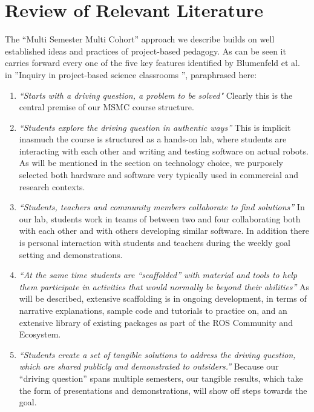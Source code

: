 \section{Review of Relevant Literature}

The ``Multi Semester Multi Cohort'' approach we describe builds on well established ideas and practices of project-based pedagogy\cite{projects}. As can be seen it carries forward every one of the five key features identified by Blumenfeld et al. in ''Inquiry in project-based science classrooms \cite{blumenfeld}'', paraphrased here:
\begin{enumerate}
    \item \textit{``Starts with a driving question, a problem to be solved"} Clearly this is the central premise of our MSMC course structure.
    \item \textit{``Students explore the driving question in authentic ways''}   This is implicit inasmuch the course is structured as a hands-on lab, where students are interacting with each other and writing and testing software on actual robots. As will be mentioned in the section on technology choice, we purposely selected both hardware and software very typically used in commercial and research contexts.
    \item \textit{``Students, teachers and community members collaborate to find solutions''} In our lab, students work in teams of between two and four collaborating both with each other and with others developing similar software. In addition there is personal interaction with students and teachers during the weekly goal setting and demonstrations.
    \item \textit{``At the same time students are ``scaffolded'' with material and tools to help them participate in activities that would  normally be beyond their abilities''} As will be described, extensive scaffolding is in ongoing development, in terms of narrative explanations, sample code and tutorials to practice on, and an extensive library of existing packages as part of the ROS Community and Ecosystem\cite{ROSCommunity}. 
    \item \textit{``Students create a set of tangible solutions to address the driving question, which are shared publicly and demonstrated to outsiders.''} Because our ``driving question'' spans multiple semesters, our tangible results, which take the form of presentations and demonstrations, will show off steps towards the goal.
\end{enumerate}

